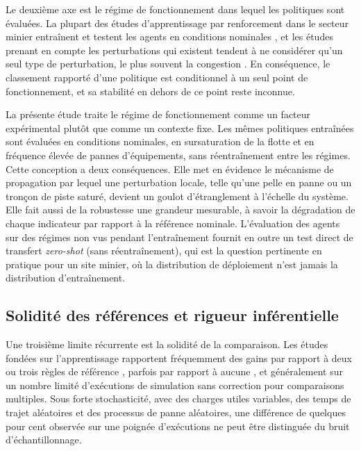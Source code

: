 \documentclass[11pt,a4paper]{article}
\begin{document}
Le deuxième axe est le régime de fonctionnement dans lequel les politiques sont évaluées. La plupart des études d'apprentissage par renforcement dans le secteur minier entraînent et testent les agents en conditions nominales \cite{deCarvalho2023, Hazrathosseini2024, Zhao2025}, et les études prenant en compte les perturbations qui existent tendent à ne considérer qu'un seul type de perturbation, le plus souvent la congestion \cite{Zeng2022}. En conséquence, le classement rapporté d'une politique est conditionnel à un seul point de fonctionnement, et sa stabilité en dehors de ce point reste inconnue.

La présente étude traite le régime de fonctionnement comme un facteur expérimental plutôt que comme un contexte fixe. Les mêmes politiques entraînées sont évaluées en conditions nominales, en sursaturation de la flotte et en fréquence élevée de pannes d'équipements, sans réentraînement entre les régimes. Cette conception a deux conséquences. Elle met en évidence le mécanisme de propagation par lequel une perturbation locale, telle qu'une pelle en panne ou un tronçon de piste saturé, devient un goulot d'étranglement à l'échelle du système. Elle fait aussi de la robustesse une grandeur mesurable, à savoir la dégradation de chaque indicateur par rapport à la référence nominale. L'évaluation des agents sur des régimes non vus pendant l'entraînement fournit en outre un test direct de transfert \textit{zero-shot} (sans réentraînement), qui est la question pertinente en pratique pour un site minier, où la distribution de déploiement n'est jamais la distribution d'entraînement.

\subsection{Solidité des références et rigueur inférentielle}

Une troisième limite récurrente est la solidité de la comparaison. Les études fondées sur l'apprentissage rapportent fréquemment des gains par rapport à deux ou trois règles de référence \cite{Zhao2025}, parfois par rapport à aucune \cite{deCarvalho2023}, et généralement sur un nombre limité d'exécutions de simulation sans correction pour comparaisons multiples. Sous forte stochasticité, avec des charges utiles variables, des temps de trajet aléatoires et des processus de panne aléatoires, une différence de quelques pour cent observée sur une poignée d'exécutions ne peut être distinguée du bruit d'échantillonnage.
\end{document}
